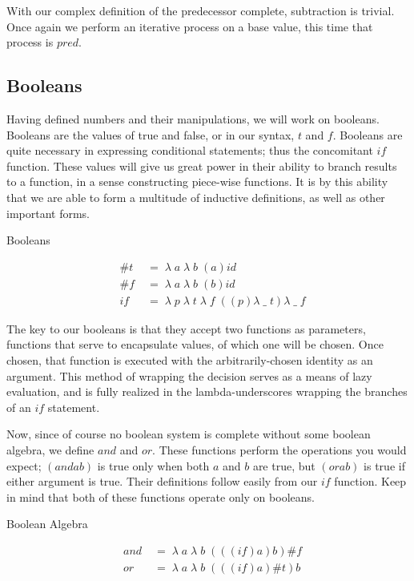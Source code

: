 With our complex definition of the predecessor complete, subtraction is trivial.
Once again we perform an iterative process on a base value, this time that process 
is $pred$.

\subsection{Booleans}
Having defined numbers and their manipulations, we will work on booleans. Booleans 
are the values of true and false, or in our syntax, $t$ and $f$. Booleans are
quite necessary in expressing conditional statements; thus the concomitant $if$
function. These values will give us great power in their ability to branch results 
to a function, in a sense constructing piece-wise functions. It is by this ability 
that we are able to form a multitude of inductive definitions, as well as other 
important forms.

Booleans
\begin{figure}[ht]
\caption{}\label{scheme}
\begin{align*}
& \#t \; &= \; \lambda \; a \; \lambda \; b \; (a)id
\\& \#f \; &= \; \lambda \; a \; \lambda \; b \; (b)id
\\& if \; &= \; \lambda \; p \; \lambda \; t \; \lambda \; f \; ((p)\lambda \; \_ \; t)\lambda \; \_ \; f
\end{align*}
\end{figure}

The key to our booleans is that they accept two functions as parameters, functions 
that serve to encapsulate values, of which one will be chosen. Once chosen, that 
function is executed with the arbitrarily-chosen identity as an argument. This
method of wrapping the decision serves as a means of lazy evaluation, and is fully 
realized in the lambda-underscores wrapping the branches of an $if$ statement.

Now, since of course no boolean system is complete without some boolean algebra, 
we define $and$ and $or$. These functions perform the operations you would expect; 
$(and a b)$ is true only when both $a$ and $b$ are true, but $(or a b)$ is true if 
either argument is true. Their definitions follow easily from our $if$ function. 
Keep in mind that both of these functions operate only on booleans.

Boolean Algebra
\begin{figure}[ht]
\caption{}\label{scheme}
\begin{align*}
& and \; &= \; \lambda \; a \; \lambda \; b \; (((if)a)b)\#f
\\& or \; &= \; \lambda \; a \; \lambda \; b \; (((if)a)\#t)b
\end{align*}
\end{figure}

